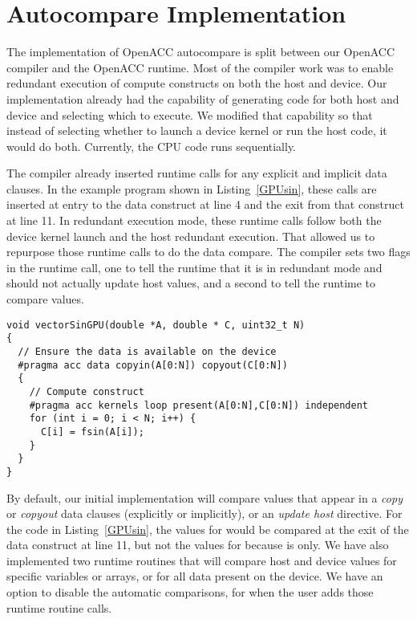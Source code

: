 \section{Autocompare Implementation}

The implementation of OpenACC autocompare is split between our OpenACC compiler and the OpenACC runtime.
Most of the compiler work was to enable redundant execution of compute constructs on both the host and device.
Our implementation already had the capability of generating code for both host and device and selecting which to execute.
We modified that capability so that instead of selecting whether to launch a device kernel or run the host code, it would do both.
Currently, the CPU code runs sequentially.

The compiler already inserted runtime calls for any explicit and implicit data clauses.
In the example program shown in Listing~\ref{GPUsin}, these calls are inserted at entry to the data construct at line 4 and the exit from that construct at line 11.
In redundant execution mode, these runtime calls follow both the device kernel launch and the host redundant execution.
That allowed us to repurpose those runtime calls to do the data compare.
The compiler sets two flags in the runtime call, one to tell the runtime that it is in redundant mode and should not actually update host values, and a second to tell the runtime to compare values.
\begin{lstlisting}[caption={Sample OpenACC loop}, label=GPUsin,frame=single,style=Cstyle]
void vectorSinGPU(double *A, double * C, uint32_t N)
{
  // Ensure the data is available on the device
  #pragma acc data copyin(A[0:N]) copyout(C[0:N])
  {
    // Compute construct
    #pragma acc kernels loop present(A[0:N],C[0:N]) independent
    for (int i = 0; i < N; i++) {
      C[i] = fsin(A[i]);
    }
  }
}
\end{lstlisting}

By default, our initial implementation will compare values that appear in a \emph{copy} or \emph{copyout} data clauses (explicitly or implicitly), or an \emph{update host} directive.
For the code in Listing~\ref{GPUsin}, the values for  would be compared at the exit of the data construct at line 11, but not the values for  because  is  only.
We have also implemented two runtime routines that will compare host and device values for specific variables or arrays, or for all data present on the device.
We have an option to disable the automatic comparisons, for when the user adds those runtime routine calls.



